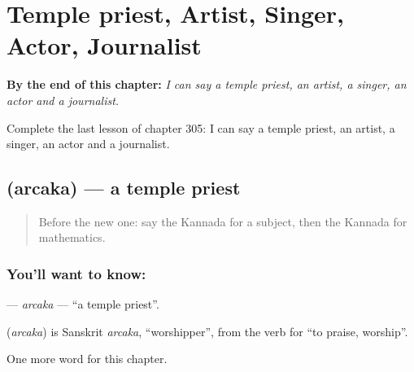 
\chapter{Temple priest, Artist, Singer, Actor, Journalist}
\label{ch:ka-temple-priest-artist-singer-actor-journalist}

\begin{chapteropening}
\textbf{By the end of this chapter:} \emph{I can say a temple priest, an artist, a singer, an actor and a journalist.}

Complete the last lesson of chapter 305: I can say a temple priest, an artist, a singer, an actor and a journalist.
\end{chapteropening}

\section[\texorpdfstring{\kn{ಅರ್ಚಕ} (arcaka)}{ಅರ್ಚಕ (arcaka)}]{ (arcaka) — a temple priest}

\label{lesson:KA-C305-arcaka}



\begin{quote}
Before the new one: say the Kannada for a subject, then the Kannada for mathematics.
\end{quote}

\subsection*{You'll want to know: }
\textbf{} — \emph{arcaka} — \textquotedblleft{}a temple priest\textquotedblright{}.

\begin{cousinweb}
\textbf{} (\emph{arcaka}) is Sanskrit \emph{arcaka}, \textquotedblleft{}worshipper\textquotedblright{}, from the verb for \textquotedblleft{}to praise, worship\textquotedblright{}.
\end{cousinweb}

\begin{grammarlens}[title={What you've built}]
One more word for this chapter.
\end{grammarlens}

